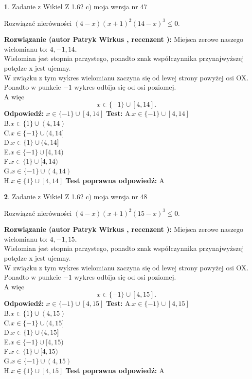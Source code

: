 \documentclass[12pt, a4paper]{article}
\theoremstyle{definition} %
\newtheorem{zad}{}
\newcommand{\zadStart}[1]{\begin{zad}#1\newline}
\newcommand{\zadStop}{\end{zad}}
\newcommand{\rozwStart}[2]{\noindent \textbf{Rozwiązanie (autor #1 , recenzent #2): }\newline}
\newcommand{\rozwStop}{\newline}
\newcommand{\odpStart}{\noindent \textbf{Odpowiedź:}\newline}
\newcommand{\odpStop}{\newline}
\newcommand{\testStart}{\noindent \textbf{Test:}\newline}
\newcommand{\testStop}{\newline}
\newcommand{\kluczStart}{\noindent \textbf{Test poprawna odpowiedź:}\newline}
\newcommand{\kluczStop}{\newline}
\begin{document}
\zadStart{Zadanie z Wikieł Z 1.62 c) moja wersja nr 47}

Rozwiązać nierówności $(4-x)(x+1)^{2}(14-x)^{3}\le0$.
\zadStop
\rozwStart{Patryk Wirkus}{}
Miejsca zerowe naszego wielomianu to: $4, -1, 14$.\\
Wielomian jest stopnia parzystego, ponadto znak współczynnika przy\linebreak najwyższej potędze x jest ujemny.\\ W związku z tym wykres wielomianu zaczyna się od lewej strony powyżej osi OX.\\
Ponadto w punkcie $-1$ wykres odbija się od osi poziomej.\\
A więc $$x \in \{-1\} \cup [4,14].$$
\rozwStop
\odpStart
$x \in \{-1\} \cup [4,14]$
\odpStop
\testStart
A.$x \in \{-1\} \cup [4,14]$\\
B.$x \in \{1\} \cup (4,14)$\\
C.$x \in \{-1\} \cup (4,14]$\\
D.$x \in \{1\} \cup (4,14]$\\
E.$x \in \{-1\} \cup [4,14)$\\
F.$x \in \{1\} \cup [4,14)$\\
G.$x \in \{-1\} \cup (4,14)$\\
H.$x \in \{1\} \cup [4,14]$
\testStop
\kluczStart
A
\kluczStop



\zadStart{Zadanie z Wikieł Z 1.62 c) moja wersja nr 48}

Rozwiązać nierówności $(4-x)(x+1)^{2}(15-x)^{3}\le0$.
\zadStop
\rozwStart{Patryk Wirkus}{}
Miejsca zerowe naszego wielomianu to: $4, -1, 15$.\\
Wielomian jest stopnia parzystego, ponadto znak współczynnika przy\linebreak najwyższej potędze x jest ujemny.\\ W związku z tym wykres wielomianu zaczyna się od lewej strony powyżej osi OX.\\
Ponadto w punkcie $-1$ wykres odbija się od osi poziomej.\\
A więc $$x \in \{-1\} \cup [4,15].$$
\rozwStop
\odpStart
$x \in \{-1\} \cup [4,15]$
\odpStop
\testStart
A.$x \in \{-1\} \cup [4,15]$\\
B.$x \in \{1\} \cup (4,15)$\\
C.$x \in \{-1\} \cup (4,15]$\\
D.$x \in \{1\} \cup (4,15]$\\
E.$x \in \{-1\} \cup [4,15)$\\
F.$x \in \{1\} \cup [4,15)$\\
G.$x \in \{-1\} \cup (4,15)$\\
H.$x \in \{1\} \cup [4,15]$
\testStop
\kluczStart
A
\kluczStop
\end{document}
